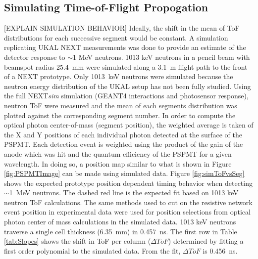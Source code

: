 \subsection{Simulating Time-of-Flight Propogation}
\begin{comment}
\begin{table}[t]
\caption{Slopes in $\left[\sfrac{ns}{col}\right]$ from three different ranged fits to the data shown in Figure \ref{fig:simToFvsSeg}.}
\label{tab:simSlopes}
\begin{center}
\begin{tabular}{c c c}
 \hline
  Col. 1-8 & Col. 1-7 & Col. 2-7 \\
 \hline
 \hline
  $0.456\pm0.020$  & $0.486\pm0.022$ & $0.453\pm0.027$ \\
 \hline
\end{tabular}
\end{center}
\end{table}
\end{comment}
[EXPLAIN SIMULATION BEHAVIOR]
 Ideally, the shift in the mean of ToF distributions for each successive segment would be constant. A simulation replicating UKAL NEXT measurements was done to provide an estimate of the detector response to $\sim$1 MeV neutrons. 1013 keV neutrons in a pencil beam with beamspot radius 25.4~mm were simulated along a 3.1~m flight path to the front of a NEXT prototype. Only 1013~keV neutrons were simulated because the neutron energy distribution of the UKAL setup has not been fully studied. Using the full NEXT\emph{sim} simulation (GEANT4 interactions and photosensor response), neutron ToF were measured and the mean of each segments distribution was plotted against the corresponding segment number. In order to compute the optical photon center-of-mass (segment position), the weighted average is taken of the X and Y positions of each individual photon detected at the surface of the PSPMT. Each detection event is weighted using the product of the gain of the anode which was hit and the quantum efficiency of the PSPMT for a given wavelength. In doing so, a position map similar to what is shown in Figure \ref{fig:PSPMTImage} can be made using simulated data.
Figure \ref{fig:simToFvsSeg} shows the expected prototype position dependent timing behavior when detecting $\sim$1~MeV neutrons. The dashed red line is the expected fit based on 1013 keV neutron ToF calculations. The same methods used to cut on the resistive network event position in experimental data were used for position selections from optical photon center of mass calculations in the simulated data. 1013 keV neutrons traverse a single cell thickness (6.35~mm) in 0.457~ns. The first row in Table \ref{tab:Slopes} shows the shift in ToF per column ($\Delta ToF$) determined by fitting a first order polynomial to the simulated data. From the fit, $\Delta ToF$ is 0.456~ns.  

